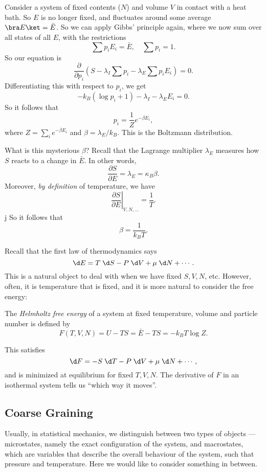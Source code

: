 \documentclass[a4paper]{article}
\begin{document}
\begin{eg}
  Consider a system of fixed contents ($N$) and volume $V$ in contact with a heat bath. So $E$ is no longer fixed, and fluctuates around some average $\bra E \ket = \bar{E}$. So we can apply Gibbs' principle again, where we now sum over all states of all $E$, with the restrictions
  \[
    \sum p_i E_i = \bar{E},\quad \sum p_i = 1.
  \]
  So our equation is
  \[
    \frac{\partial}{\partial p_i} \left(S - \lambda_I \sum p_i - \lambda_E \sum p_i E_i\right) = 0.
  \]
  Differentiating this with respect to $p_i$, we get
  \[
     -k_B (\log p_i + 1) - \lambda_I - \lambda_E E_i = 0.
  \]
  So it follows that
  \[
    p_i = \frac{1}{Z} e^{-\beta E_i},
  \]
  where $Z = \sum_i e^{-\beta E_i}$ and $\beta = \lambda_E/k_B$. This is the Boltzmann distribution.

  What is this mysterious $\beta$? Recall that the Lagrange multiplier $\lambda_E$ measures how $S$ reacts to a change in $\bar{E}$. In other words,
   \[
    \frac{\partial S}{\partial E} = \lambda_E = \kappa_B \beta.
  \]
  Moreover, \emph{by definition} of temperature, we have
  \[
    \left.\frac{\partial S}{\partial E}\right|_{V, N, \ldots} = \frac{1}{T}.
  \]
j So it follows that
  \[
    \beta = \frac{1}{k_B T}.
  \]
\end{eg}
Recall that the first law of thermodynamics says
\[
  \d E = T\;\d S - P \;\d V + \mu \;\d N + \cdots.
\]
This is a natural object to deal with when we have fixed $S, V, N$, etc. However, often, it is temperature that is fixed, and it is more natural to consider the free energy:
\begin{defi}
  The \emph{Helmholtz free energy} of a system at fixed temperature, volume and particle number is defined by
  \[
    F(T, V, N) = U - TS = \bar{E} - TS = - k_B T \log Z.
  \]
\end{defi}
This satisfies
\[
  \d F = -S \;\d T - P\;\d V + \mu\;\d N + \cdots,
\]
and is minimized at equilibrium for fixed $T, V, N$. The derivative of $F$ in an isothermal system tells us ``which way it moves''.

\subsection{Coarse Graining}
Usually, in statistical mechanics, we distinguish between two types of objects --- microstates, namely the exact configuration of the system, and macrostates, which are variables that describe the overall behaviour of the system, such that pressure and temperature. Here we would like to consider something in between.
\end{document}
